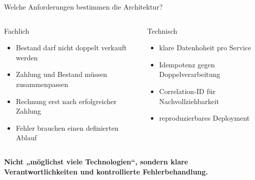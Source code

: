 \documentclass[aspectratio=169,11pt]{beamer}
\newcommand{\storyline}[1]{\vspace{.25cm}\begin{center}\colorbox{hsBlue!8}{\parbox{.92\linewidth}{\centering\small\textbf{#1}}}\end{center}}
\begin{document}
\begin{frame}{Welche Anforderungen bestimmen die Architektur?}
\begin{columns}[T,onlytextwidth]
\begin{block}{Fachlich}
\begin{itemize}
  \item Bestand darf nicht doppelt verkauft werden
  \item Zahlung und Bestand müssen zusammenpassen
  \item Rechnung erst nach erfolgreicher Zahlung
  \item Fehler brauchen einen definierten Ablauf
\end{itemize}
\end{block}
\begin{block}{Technisch}
\begin{itemize}
  \item klare Datenhoheit pro Service
  \item Idempotenz gegen Doppelverarbeitung
  \item Correlation-ID für Nachvollziehbarkeit
  \item reproduzierbares Deployment
\end{itemize}
\end{block}
\end{columns}
\storyline{Nicht „möglichst viele Technologien“, sondern klare Verantwortlichkeiten und kontrollierte Fehlerbehandlung.}
\end{frame}
\end{document}
